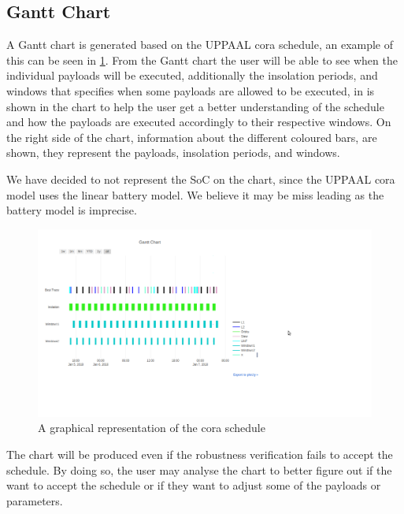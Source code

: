 \subsection{Gantt Chart} \label{subsec:gantt}
A Gantt chart is generated based on the UPPAAL \gls{cora} schedule, an example of this can be seen in \cref{fig:gantt}. From the Gantt chart the user will be able to see when the individual payloads will be executed, additionally the insolation periods, and windows that specifies when some payloads are allowed to be executed, in is shown in the chart to help the user get a better understanding of the schedule and how the payloads are executed accordingly to their respective windows. On the right side of the chart, information about the different coloured bars, are shown, they represent the payloads, insolation periods, and windows. 

We have decided to not represent the SoC on the chart, since the UPPAAL \gls{cora} model uses the linear battery model. We believe it may be miss leading as the battery model is imprecise.

\begin{figure}[!h]
	\includegraphics[width=\textwidth]{graphics/gantt.png}
	\caption{A graphical representation of the \gls{cora} schedule}
	\label{fig:gantt}
\end{figure}
The chart will be produced even if the robustness verification fails to accept the schedule. By doing so, the user may analyse the chart to better figure out if the want to accept the schedule or if they want to adjust some of the payloads or parameters.
